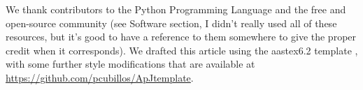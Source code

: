 \acknowledgments

We thank contributors to the Python Programming Language and the free and
open-source community (see Software section, I didn't really used all
of these resources, but it's good to have a reference to them
somewhere to give the proper credit when it corresponds). We drafted
this article using the aastex6.2 template
\citep{AASteamHendrickson2018aastex62}, with some further style
modifications that are available at
\href{https://github.com/pcubillos/ApJtemplate}
{https://github.com/pcubillos/ApJtemplate}.





